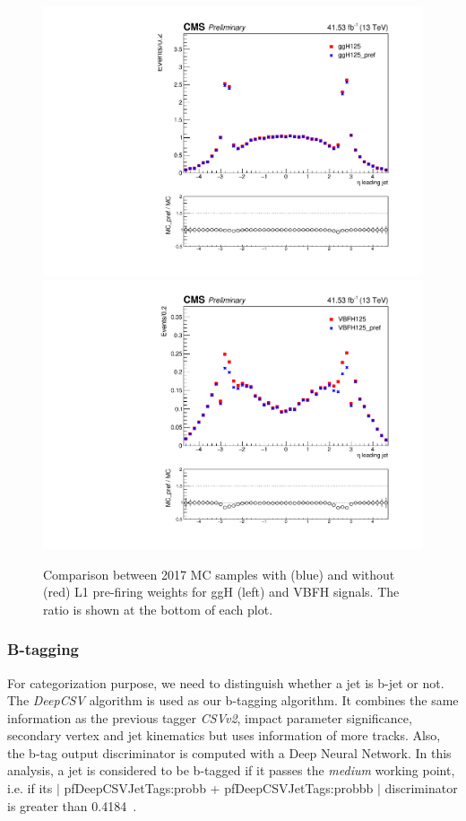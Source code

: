 
\begin{figure}[!h]
\centering

\includegraphics[width=0.49\linewidth]{Figures/Jets/JetEta_GGH_data2017_ZZTree_ratio.pdf} 
\includegraphics[width=0.49\linewidth]{Figures/Jets/JetEta_VBF_data2017_ZZTree_ratio.pdf} \\
\caption{Comparison between 2017 MC samples with (blue) and without (red) L1 pre-firing weights for ggH (left) and VBFH signals. The ratio is shown at the bottom of each plot.
\label{fig:jetL1}}
\end{figure}

\subsubsection{B-tagging}

For categorization purpose, we need to distinguish whether a jet is b-jet or not.
The \emph{DeepCSV} algorithm is used as our b-tagging algorithm. It combines the same information as the previous tagger \emph{CSVv2}, impact parameter significance, secondary vertex and jet kinematics but uses information of more tracks. Also, the b-tag output discriminator is computed with a Deep Neural Network. 
In this analysis, a jet is considered to be b-tagged if it passes the \emph{medium} working point, i.e. if its $|$ pfDeepCSVJetTags:probb + pfDeepCSVJetTags:probbb $|$ discriminator is greater than 0.4184~\cite{BTAG2018}.

